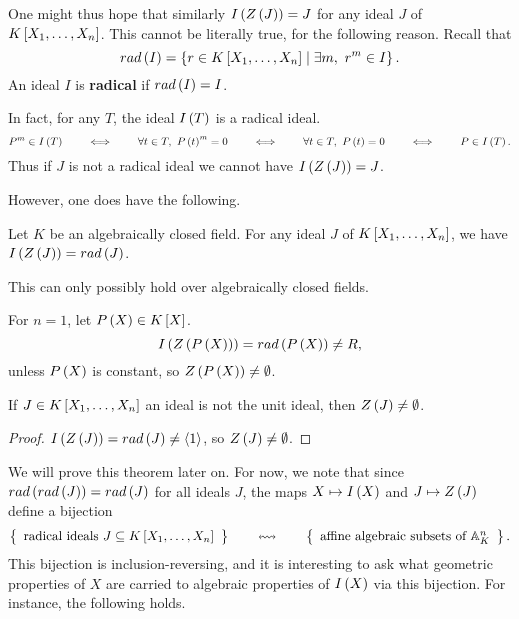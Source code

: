 One might thus hope that similarly $ I\rb{Z\rb{J}} = J $ for any ideal $ J $ of $ K\sb{X_1, \dots, X_n} $. This cannot be literally true, for the following reason. Recall that
$$ rad\rb{I} = \cb{r \in K\sb{X_1, \dots, X_n} \mid \exists m, \ r^m \in I}. $$
An ideal $ I $ is \textbf{radical} if $ rad\rb{I} = I $.

\begin{note*}
In fact, for any $ T $, the ideal $ I\rb{T} $ is a radical ideal.
$$ P^m \in I\rb{T} \qquad \iff \qquad \forall t \in T, \ P\rb{t}^m = 0 \qquad \iff \qquad \forall t \in T, \ P\rb{t} = 0 \qquad \iff \qquad P \in I\rb{T}. $$
Thus if $ J $ is not a radical ideal we cannot have $ I\rb{Z\rb{J}} = J $.
\end{note*}

However, one does have the following.

\begin{theorem}
\label{thm:13.2.5}
Let $ K $ be an algebraically closed field. For any ideal $ J $ of $ K\sb{X_1, \dots, X_n} $, we have $ I\rb{Z\rb{J}} = rad\rb{J} $.
\end{theorem}

\begin{note*}
This can only possibly hold over algebraically closed fields.
\end{note*}

\begin{example*}
For $ n = 1 $, let $ P\rb{X} \in K\sb{X} $.
$$ I\rb{Z\rb{P\rb{X}}} = rad\rb{P\rb{X}} \ne R, $$
unless $ P\rb{X} $ is constant, so $ Z\rb{P\rb{X}} \ne \emptyset $.
\end{example*}

\begin{corollary}
If $ J \in K\sb{X_1, \dots, X_n} $ an ideal is not the unit ideal, then $ Z\rb{J} \ne \emptyset $.
\end{corollary}

\begin{proof}
$ I\rb{Z\rb{J}} = rad\rb{J} \ne \ab{1} $, so $ Z\rb{J} \ne \emptyset $.
\end{proof}


We will prove this theorem later on. For now, we note that since $ rad\rb{rad\rb{J}} = rad\rb{J} $ for all ideals $ J $, the maps $ X \mapsto I\rb{X} $ and $ J \mapsto Z\rb{J} $ define a bijection
$$ \correspondence{\text{radical ideals} \ J \subseteq K\sb{X_1, \dots, X_n}}{\text{affine algebraic subsets of} \ \A_K^n}. $$
This bijection is inclusion-reversing, and it is interesting to ask what geometric properties of $ X $ are carried to algebraic properties of $ I\rb{X} $ via this bijection. For instance, the following holds.

